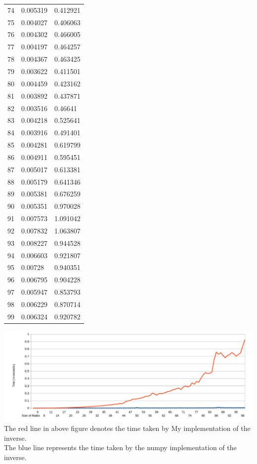 \documentclass[runningheads]{llncs}
\begin{document}
\begin{longtable}{| p{} | p{} | p{} |}
74 & 0.005319 & 0.412921 \\
75 & 0.004027 & 0.406063 \\
76 & 0.004302 & 0.466005 \\
77 & 0.004197 & 0.464257 \\
78 & 0.004367 & 0.463425 \\
79 & 0.003622 & 0.411501 \\
80 & 0.004459 & 0.423162 \\
81 & 0.003892 & 0.437871 \\
82 & 0.003516 & 0.46641 \\
83 & 0.004218 & 0.525641 \\
84 & 0.003916 & 0.491401 \\
85 & 0.004281 & 0.619799 \\
86 & 0.004911 & 0.595451 \\
87 & 0.005017 & 0.613381 \\
88 & 0.005179 & 0.641346 \\
89 & 0.005381 & 0.676259 \\
90 & 0.005351 & 0.970028 \\
91 & 0.007573 & 1.091042 \\
92 & 0.007832 & 1.063807 \\
93 & 0.008227 & 0.944528 \\
94 & 0.006603 & 0.921807 \\
95 & 0.00728 & 0.940351 \\
96 & 0.006795 & 0.904228 \\
97 & 0.005947 & 0.853793 \\
98 & 0.006229 & 0.870714 \\
99 & 0.006324 & 0.920782 \\
\hline
\end{longtable}
\includegraphics[scale=0.8]{profiling}
The red line in above figure denotes the time taken by My implementation of the inverse.\\
The blue line represents the time taken by the numpy implementation of the inverse.\\
\end{document}
